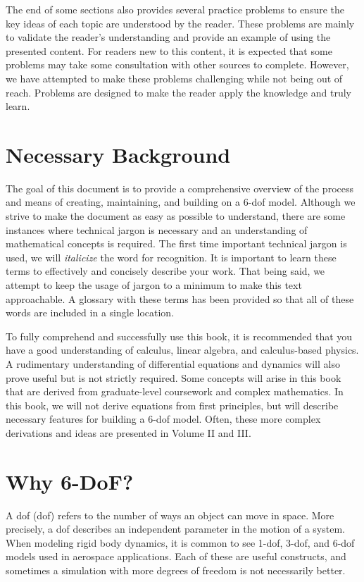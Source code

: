\documentclass[10pt, openany, titlepage]{book}
\theoremstyle{definition}
\newcounter{example}[chapter]
\begin{document}
The end of some sections also provides several practice problems to ensure the key ideas of each topic are understood by the reader. These problems are mainly to validate the reader's understanding and provide an example of using the presented content. For readers new to this content, it is expected that some problems may take some consultation with other sources to complete. However, we have attempted to make these problems challenging while not being out of reach. Problems are designed to make the reader apply the knowledge and truly learn.

\section{Necessary Background}
The goal of this document is to provide a comprehensive overview of the process and means of creating, maintaining, and building on a 6-\gls{dof} model. Although we strive to make the document as easy as possible to understand, there are some instances where technical jargon is necessary and an understanding of mathematical concepts is required. The first time important technical jargon is used, we will \textit{italicize} the word for recognition. It is important to learn these terms to effectively and concisely describe your work. That being said, we attempt to keep the usage of jargon to a minimum to make this text approachable. A glossary with these terms has been provided so that all of these words are included in a single location. 

To fully comprehend and successfully use this book, it is recommended that you have a good understanding of calculus, linear algebra, and calculus-based physics. A rudimentary understanding of differential equations and dynamics will also prove useful but is not strictly required. Some concepts will arise in this book that are derived from graduate-level coursework and complex mathematics. In this book, we will not derive equations from first principles, but will describe necessary features for building a 6-\gls{dof} model. Often, these more complex derivations and ideas are presented in Volume II and III.

\section{Why 6-DoF?}
A \acrlong{dof} (\gls{dof}) refers to the number of ways an object can move in space. More precisely, a \gls{dof} describes an independent parameter in the motion of a system. When modeling rigid body dynamics, it is common to see 1-\gls{dof}, 3-\gls{dof}, and 6-\gls{dof} models used in aerospace applications. Each of these are useful constructs, and sometimes a simulation with more degrees of freedom is not necessarily better.
\end{document}
